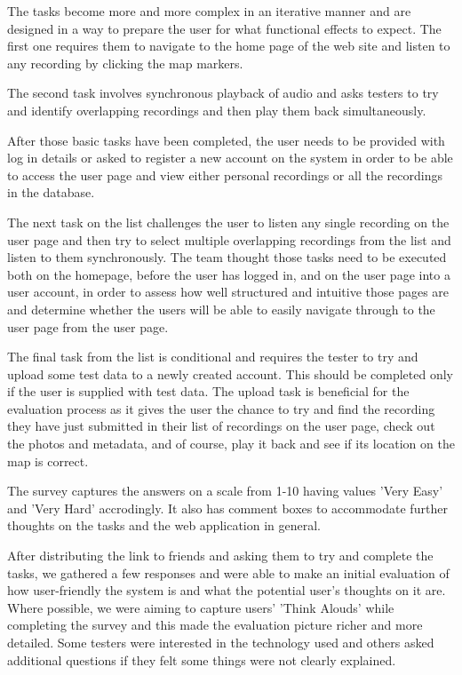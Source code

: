 \documentclass{l3proj}
\begin{document}
The tasks become more and more complex in an iterative manner and are designed in a way to prepare the user for what functional effects to expect.
The first one requires them to navigate to the home page of the web site and listen to any recording by clicking the map markers.

The second task involves synchronous playback of audio and asks testers to try and identify overlapping recordings and then play them back simultaneously.

After those basic tasks have been completed, the user needs to be provided with log in details or asked to register a new account on the system in order to be able to access the user page and view either personal recordings or all the recordings in the database.

The next task on the list challenges the user to listen any single recording on the user page and then try to select multiple overlapping recordings from the list and listen to them synchronously.
The team thought those tasks need to be executed both on the homepage, before the user has logged in, and on the user page into a user account, in order to assess how well structured and intuitive those pages are and determine whether the users will be able to easily navigate through to the user page from the user page.

The final task from the list is conditional and requires the tester to try and upload some test data to a newly created account.
This should be completed only if the user is supplied with test data.
The upload task is beneficial for the evaluation process as it gives the user the chance to try and find the recording they have just submitted in their list of recordings on the user page, check out the photos and metadata, and of course, play it back and see if its location on the map is correct.

The survey captures the answers on a scale from 1-10 having values 'Very Easy' and 'Very Hard' accrodingly.
It also has comment boxes to accommodate further thoughts on the tasks and the web application in general.

After distributing the link to friends and asking them to try and complete the tasks, we gathered a few responses and were able to make an initial evaluation of how user-friendly the system is and what the potential user's thoughts on it are.
Where possible, we were aiming to capture users' 'Think Alouds' while completing the survey and this made the evaluation picture richer and more detailed.
Some testers were interested in the technology used and others asked additional questions if they felt some things were not clearly explained.
\end{document}
